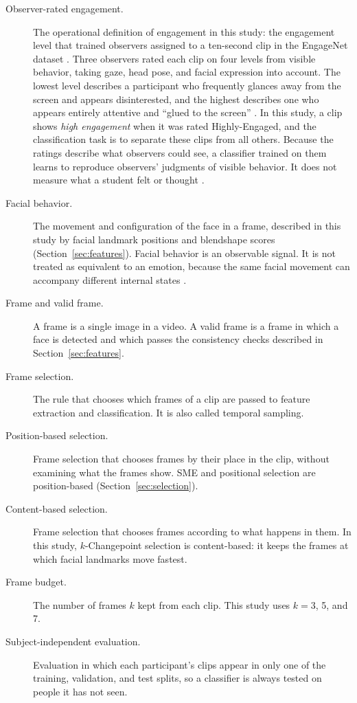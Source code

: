 \begin{description}
   \item[Observer-rated engagement.] The operational definition of engagement in this study: the engagement level that trained observers assigned to a ten-second clip in the EngageNet dataset \cite{singh2023}. Three observers rated each clip on four levels from visible behavior, taking gaze, head pose, and facial expression into account. The lowest level describes a participant who frequently glances away from the screen and appears disinterested, and the highest describes one who appears entirely attentive and ``glued to the screen'' \cite{singh2023}. In this study, a clip shows \emph{high engagement} when it was rated Highly-Engaged, and the classification task is to separate these clips from all others. Because the ratings describe what observers could see, a classifier trained on them learns to reproduce observers' judgments of visible behavior. It does not measure what a student felt or thought \cite{barrett2019}.

   \item[Facial behavior.] The movement and configuration of the face in a frame, described in this study by facial landmark positions and blendshape scores (Section~\ref{sec:features}). Facial behavior is an observable signal. It is not treated as equivalent to an emotion, because the same facial movement can accompany different internal states \cite{barrett2019}.

   \item[Frame and valid frame.] A frame is a single image in a video. A valid frame is a frame in which a face is detected and which passes the consistency checks described in Section~\ref{sec:features}.

   \item[Frame selection.] The rule that chooses which frames of a clip are passed to feature extraction and classification. It is also called temporal sampling.

   \item[Position-based selection.] Frame selection that chooses frames by their place in the clip, without examining what the frames show. SME and positional selection are position-based (Section~\ref{sec:selection}).

   \item[Content-based selection.] Frame selection that chooses frames according to what happens in them. In this study, $k$-Changepoint selection is content-based: it keeps the frames at which facial landmarks move fastest.

   \item[Frame budget.] The number of frames $k$ kept from each clip. This study uses $k = 3$, 5, and 7.

   \item[Subject-independent evaluation.] Evaluation in which each participant's clips appear in only one of the training, validation, and test splits, so a classifier is always tested on people it has not seen.

\end{description}


